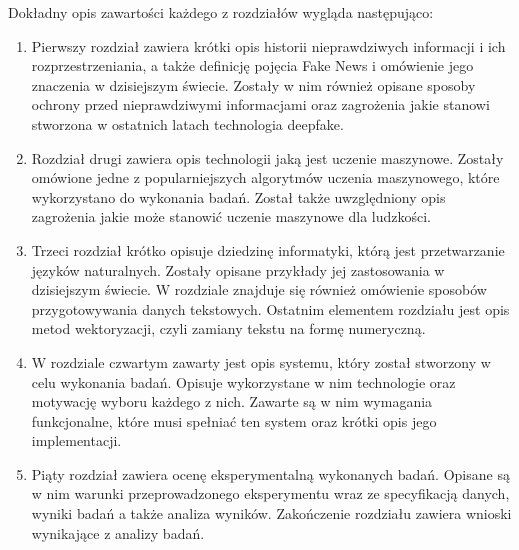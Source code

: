 Dokładny opis zawartości każdego z rozdziałów wygląda następująco:
\begin{enumerate}
    \item Pierwszy rozdział zawiera krótki opis historii nieprawdziwych informacji
    i ich rozprzestrzeniania, a także definicję pojęcia Fake News i omówienie jego znaczenia 
    w dzisiejszym świecie. Zostały w nim również opisane sposoby ochrony przed nieprawdziwymi informacjami
    oraz zagrożenia jakie stanowi stworzona w ostatnich latach technologia deepfake.
    \item Rozdział drugi zawiera opis technologii jaką jest uczenie maszynowe. Zostały
    omówione jedne z popularniejszych algorytmów uczenia maszynowego, które wykorzystano
    do wykonania badań. Został także uwzględniony opis zagrożenia jakie może stanowić uczenie
    maszynowe dla ludzkości.
    \item Trzeci rozdział krótko opisuje dziedzinę informatyki, którą jest przetwarzanie 
    języków naturalnych. Zostały opisane przykłady jej zastosowania w dzisiejszym świecie.
    W rozdziale znajduje się również omówienie sposobów przygotowywania danych tekstowych. Ostatnim elementem
    rozdziału jest opis metod wektoryzacji, czyli zamiany tekstu na formę numeryczną. 
    \item W rozdziale czwartym zawarty jest opis systemu, który został 
    stworzony w celu wykonania badań. Opisuje wykorzystane w nim technologie oraz motywację 
    wyboru każdego z nich. Zawarte są w nim wymagania funkcjonalne, które musi spełniać ten system oraz
    krótki opis jego implementacji.
    \item Piąty rozdział zawiera ocenę eksperymentalną wykonanych badań. Opisane są w nim 
    warunki przeprowadzonego eksperymentu wraz ze specyfikacją danych, wyniki badań a także 
    analiza wyników. Zakończenie rozdziału zawiera wnioski wynikające z analizy badań.  
\end{enumerate}